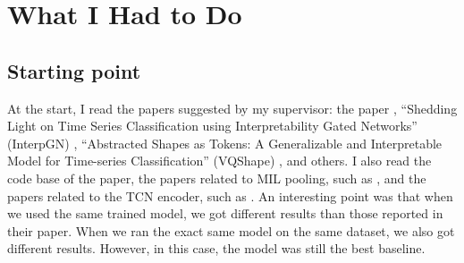 %

\section{What I Had to Do}
\label{sec:objectives}


\subsection{Starting point}


{At the start, I read the papers suggested by my supervisor: the \millet{} paper
\citep{early2024millet}, ``Shedding Light on Time Series Classification using Interpretability
Gated Networks'' (InterpGN) \citep{wen2025interpgn}, ``Abstracted Shapes as Tokens: A Generalizable
and Interpretable Model for Time-series Classification'' (VQShape) \citep{wen2024vqshape}, and
others. I also read the code base of the \millet{} paper, the papers related to MIL pooling, such
as \citep{ilse2018attention, li2021dsmil}, and the papers related to the TCN encoder, such as
\citep{bai2018tcn}. An interesting point was that when we used the same trained model, we got
different results than those reported in their paper. When we ran the exact same model on the same
dataset, we also got different results. However, in this case, the \millet{} model was still the
best baseline.}

